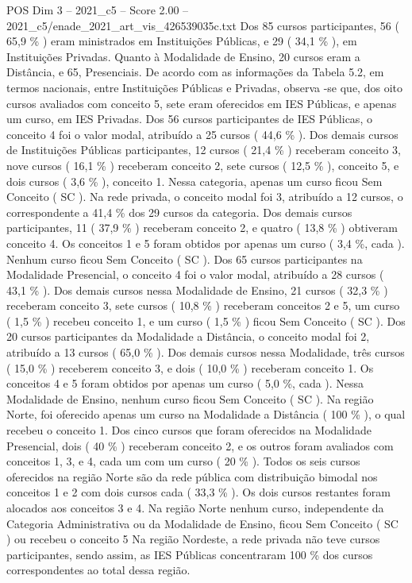 \begin{textsample}{POS Dim 3 – 2021\_c5 – Score 2.00 – 2021\_c5/enade\_2021\_art\_vis\_426539035c.txt}
Dos 85 cursos participantes, 56 ( 65,9 \% ) eram ministrados em Instituições Públicas, e 29 ( 34,1 \% ), em Instituições Privadas.
Quanto à Modalidade de Ensino, 20 cursos eram a Distância, e 65, Presenciais.
De acordo com as informações da Tabela 5.2, em termos nacionais, entre Instituições Públicas e Privadas, observa -se que, dos oito cursos avaliados com conceito 5, sete eram oferecidos em IES Públicas, e apenas um curso, em IES Privadas.
Dos 56 cursos participantes de IES Públicas, o conceito 4 foi o valor modal, atribuído a 25 cursos ( 44,6 \% ).
Dos demais cursos de Instituições Públicas participantes, 12 cursos ( 21,4 \% ) receberam conceito 3, nove cursos ( 16,1 \% ) receberam conceito 2, sete cursos ( 12,5 \% ), conceito 5, e dois cursos ( 3,6 \% ), conceito 1.
Nessa categoria, apenas um curso ficou Sem Conceito ( SC ).
Na rede privada, o conceito modal foi 3, atribuído a 12 cursos, o correspondente a 41,4 \% dos 29 cursos da categoria.
Dos demais cursos participantes, 11 ( 37,9 \% ) receberam conceito 2, e quatro ( 13,8 \% ) obtiveram conceito 4.
Os conceitos 1 e 5 foram obtidos por apenas um curso ( 3,4 \%, cada ).
Nenhum curso ficou Sem Conceito ( SC ).
Dos 65 cursos participantes na Modalidade Presencial, o conceito 4 foi o valor modal, atribuído a 28 cursos ( 43,1 \% ).
Dos demais cursos nessa Modalidade de Ensino, 21 cursos ( 32,3 \% ) receberam conceito 3, sete cursos ( 10,8 \% ) receberam conceitos 2 e 5, um curso ( 1,5 \% ) recebeu conceito 1, e um curso ( 1,5 \% ) ficou Sem Conceito ( SC ).
Dos 20 cursos participantes da Modalidade a Distância, o conceito modal foi 2, atribuído a 13 cursos ( 65,0 \% ).
Dos demais cursos nessa Modalidade, três cursos ( 15,0 \% ) receberem conceito 3, e dois ( 10,0 \% ) receberam conceito 1.
Os conceitos 4 e 5 foram obtidos por apenas um curso ( 5,0 \%, cada ).
Nessa Modalidade de Ensino, nenhum curso ficou Sem Conceito ( SC ).
Na região Norte, foi oferecido apenas um curso na Modalidade a Distância ( 100 \% ), o qual recebeu o conceito 1.
Dos cinco cursos que foram oferecidos na Modalidade Presencial, dois ( 40 \% ) receberam conceito 2, e os outros foram avaliados com conceitos 1, 3, e 4, cada um com um curso ( 20 \% ).
Todos os seis cursos oferecidos na região Norte são da rede pública com distribuição bimodal nos conceitos 1 e 2 com dois cursos cada ( 33,3 \% ).
Os dois cursos restantes foram alocados aos conceitos 3 e 4.
Na região Norte nenhum curso, independente da Categoria Administrativa ou da Modalidade de Ensino, ficou Sem Conceito ( SC ) ou recebeu o conceito 5 Na região Nordeste, a rede privada não teve cursos participantes, sendo assim, as IES Públicas concentraram 100 \% dos cursos correspondentes ao total dessa região.

\end{textsample}

